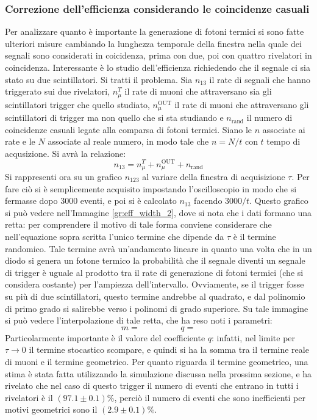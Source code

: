 \subsubsection{Correzione dell'efficienza considerando le coincidenze casuali}
Per analizzare quanto è importante la generazione di fotoni termici si sono fatte ulteriori misure cambiando la lunghezza temporale della finestra nella quale dei segnali sono considerati in coicidenza, prima con due, poi con quattro rivelatori in coincidenza.
Interessante è lo studio dell'efficienza richiedendo che il segnale ci sia stato su due scintillatori. Si tratti il problema. Sia $n_{13}$ il rate di segnali che hanno triggerato sui due rivelatori, $n_\mu^T$ il rate di muoni che attraversano sia gli scintillatori trigger che quello studiato, $n_\mu^\text{OUT}$ il rate di muoni che attraversano gli scintillatori di trigger ma non quello che si sta studiando e $n_\text{rand}$ il numero di coincidenze casuali legate alla comparsa di fotoni termici. Siano le $n$ associate ai rate e le $N$ associate al reale numero, in modo tale che $n=N/t$ con $t$ tempo di acqusizione. Si avrà la relazione:
\begin{equation}
  n_{13} = n_\mu^T + n_\mu^\text{OUT} + n_\text{rand}
\end{equation}
Si rappresenti ora su un grafico $n_{123}$ al variare della finestra di acquisizione $\tau$. Per fare ciò si è semplicemente acquisito impostando l'oscilloscopio in modo
che si fermasse dopo 3000 eventi, e poi si è calcolato $n_{13}$ facendo $3000/t$. Questo grafico si può vedere nell'Immagine \ref{gr:eff_width_2}, dove si nota che i dati formano una retta: per comprendere il motivo di tale forma conviene considerare che nell'equazione sopra scritta l'unico termine che dipende da $\tau$ è il termine randomico.
Tale termine avrà un'andamento lineare in quanto una volta che in un diodo si genera un fotone termico la probabilità che il segnale diventi un segnale di trigger è uguale al prodotto tra il rate di generazione di fotoni termici (che si considera costante) per l'ampiezza dell'intervallo. Ovviamente, se il trigger fosse su più di due scintillatori, questo termine andrebbe  al quadrato, e dal polinomio di primo grado si salirebbe verso i polinomi di grado superiore. Su tale immagine si può vedere l'interpolazione di tale retta, che ha reso noti i parametri:
\begin{equation}
  m = \hspace{2cm} q = 
\end{equation}
Particolarmente importante è il valore del coefficiente $q$: infatti, nel limite per $\tau \to 0$ il termine stocastico scompare, e quindi si ha la somma tra il termine reale di muoni e il termine geometrico. Per quanto riguarda il termine geometrico, una stima è stata fatta utilizzando la simulazione discussa nella prossima sezione, e ha rivelato che nel caso di questo trigger il numero di eventi che entrano in tutti i rivelatori è il $(97.1 \pm 0.1) \%$, perciò il numero di eventi che sono inefficienti per motivi geometrici sono il $(2.9 \pm 0.1) \%$.

